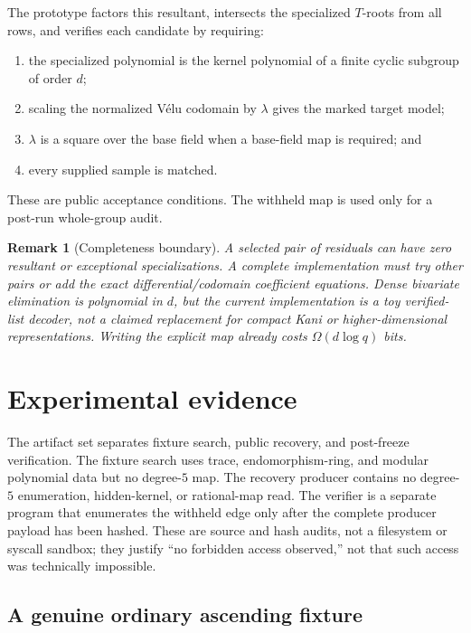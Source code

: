 \documentclass[11pt]{article}
\newtheorem{remark}[theorem]{Remark}
\begin{document}
The prototype factors this resultant, intersects the specialized
$T$-roots from all rows, and verifies each candidate by requiring:

\begin{enumerate}[leftmargin=*,label=(\arabic*)]
\item the specialized polynomial is the kernel polynomial of a finite cyclic
      subgroup of order $d$;
\item scaling the normalized V\'elu codomain by $\lambda$ gives the marked
      target model;
\item $\lambda$ is a square over the base field when a base-field map is
      required; and
\item every supplied sample is matched.
\end{enumerate}

These are public acceptance conditions.  The withheld map is used only for a
post-run whole-group audit.

\begin{remark}[Completeness boundary]
A selected pair of residuals can have zero resultant or exceptional
specializations.  A complete implementation must try other pairs or add the
exact differential/codomain coefficient equations.  Dense bivariate
elimination is polynomial in $d$, but the current implementation is a toy
verified-list decoder, not a claimed replacement for compact Kani or
higher-dimensional representations.  Writing the explicit map already costs
$\Omega(d\log q)$ bits.
\end{remark}

\section{Experimental evidence}

The artifact set separates fixture search, public recovery, and post-freeze
verification.  The fixture search uses trace, endomorphism-ring, and modular
polynomial data but no degree-$5$ map.  The recovery producer contains no
degree-$5$ enumeration, hidden-kernel, or rational-map read.  The verifier is
a separate program that enumerates the withheld edge only after the complete
producer payload has been hashed.  These are source and hash audits, not a
filesystem or syscall sandbox; they justify ``no forbidden access observed,''
not that such access was technically impossible.

\subsection{A genuine ordinary ascending fixture}
\end{document}
